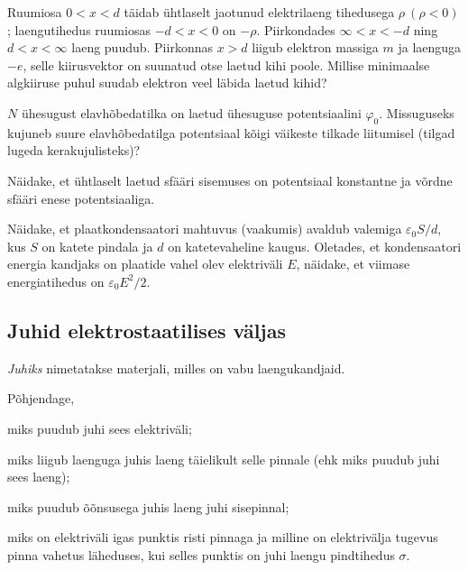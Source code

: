 \documentclass[a4paper,11pt,twocolumn]{article}
\begin{document}
\begin{question}
Ruumiosa \( 0 < x < d \) täidab ühtlaselt jaotunud elektrilaeng tihedusega \( \rho \ (\rho<0)\); laengutihedus ruumiosas \( −d < x < 0 \) on \( -\rho \). Piirkondades \( \infty < x < −d \) ning \( d < x < \infty \) laeng puudub. Piirkonnas \( x > d \) liigub elektron massiga \( m \) ja laenguga \( −e \), selle kiirusvektor on suunatud otse laetud kihi poole. Millise minimaalse algkiiruse puhul suudab elektron veel läbida laetud kihid?
\end{question}

\begin{question}
\( N \) ühesugust elavhõbedatilka on laetud ühesuguse potentsiaalini \( \varphi_0 \). Missuguseks kujuneb suure elavhõbedatilga potentsiaal kõigi väikeste tilkade liitumisel (tilgad lugeda kerakujulisteks)?
\end{question}

\begin{question}
Näidake, et ühtlaselt laetud sfääri sisemuses on potentsiaal konstantne ja võrdne sfääri enese potentsiaaliga.
\end{question}

\begin{question}
Näidake, et plaatkondensaatori mahtuvus (vaakumis) avaldub valemiga \(\varepsilon_0 S/d\), kus \(S\) on katete pindala ja \(d\) on katetevaheline kaugus. Oletades, et kondensaatori energia kandjaks on plaatide vahel olev elektriväli \(E\), näidake, et viimase energiatihedus on \(\varepsilon_0 E^2/2\).
\end{question}

\subsection{Juhid elektrostaatilises väljas}
\textit{Juhiks} nimetatakse materjali, milles on vabu laengukandjaid.
\begin{question}
    Põhjendage,
    \begin{subquestion}
    \item miks puudub juhi sees elektriväli;
    \item miks liigub laenguga juhis laeng täielikult selle pinnale (ehk miks puudub juhi sees laeng);
    \item miks puudub õõnsusega juhis laeng juhi sisepinnal;
    \item miks on elektriväli igas punktis risti pinnaga ja milline on elektrivälja tugevus pinna vahetus läheduses, kui selles punktis on juhi laengu pindtihedus $\sigma$.
    \end{subquestion}
\end{question}
\end{document}

